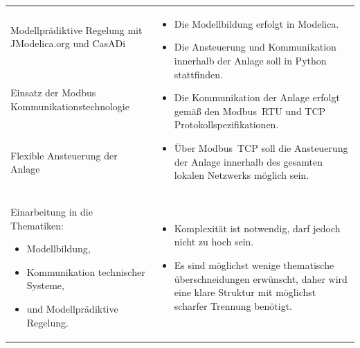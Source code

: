 \begin{table}[H]
\begin{tabularx}{1\textwidth}{m{}m{}}
\addlinespace[4mm] Modellprädiktive Regelung mit JModelica.org und CasADi \newline & \multirow{3}{\hsize}{
\begin{minipage}[t]{0.57\textwidth}
\begin{itemize}[itemsep=0pt,topsep=0pt,leftmargin=5mm]
\item Die Modellbildung erfolgt in Modelica.
\item Die Ansteuerung und Kommunikation innerhalb der Anlage soll in Python stattfinden.
\item Die Kommunikation der Anlage erfolgt gemäß den Modbus~RTU und TCP Protokollspezifikationen.
\item Über Modbus~TCP soll die Ansteuerung der Anlage innerhalb des gesamten lokalen Netzwerks möglich sein.
\end{itemize}
\end{minipage}
}  \\

\cmidrule[0.1pt](lr{2em}){1-1}
\addlinespace[4mm] Einsatz der Modbus \newline Kommunikationstechnologie \newline 	& 		\\

\cmidrule[0.1pt](lr{2em}){1-1}
\addlinespace[4mm] Flexible Ansteuerung der Anlage \newline & \\

\cmidrule[0.5pt](r{0.25em}){1-1} 
\cmidrule[0.5pt](l{0.25em}){2-2}

Einarbeitung in die Thematiken:
\begin{minipage}[t]{0.34\textwidth}
\begin{itemize}[itemsep=0pt,topsep=0pt,leftmargin=4mm]
	\item Modellbildung,
	\item Kommunikation technischer \newline Systeme,
	\item und Modellprädiktive \newline Regelung.
\end{itemize}
\end{minipage}
 	& \multirow{2}{\hsize}{
\begin{minipage}[t]{0.57\textwidth}
\begin{itemize}[itemsep=0pt,topsep=0pt,leftmargin=5mm]
	\item Komplexität ist notwendig, darf jedoch nicht zu hoch sein.
	\item Es sind möglichst wenige thematische überschneidungen erwünscht, daher wird eine klare Struktur mit möglichst scharfer Trennung benötigt.
\end{itemize}
\end{minipage}
}  \\


\end{tabularx}
\end{table}
